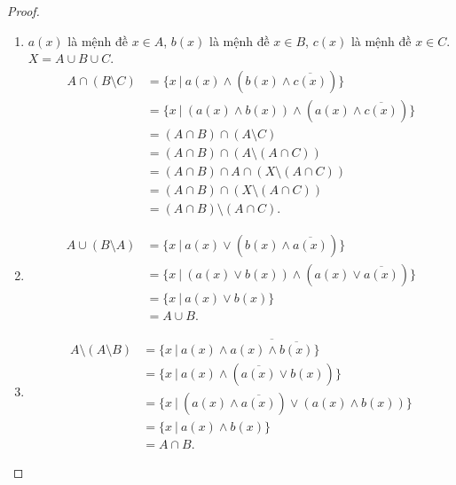\begin{proof}
\begin{enumerate}[label = (\alph*)]
        \item $a(x)$ là mệnh đề $x \in A$, $b(x)$ là mệnh đề $x\in B$, $c(x)$ là mệnh đề $x\in C$. $X = A\cup B\cup C$.
              \begin{align*}
                  A\cap (B\setminus C) & = \{ x\ |\ a(x) \land (b(x) \land \overline{c(x)}) \}              \\
                                       & = \{ x\ |\ (a(x) \land b(x)) \land (a(x) \land\overline{c(x)}) \} \\
                                       & = (A\cap B) \cap (A\setminus C)                                      \\
                                       & = (A\cap B) \cap (A\setminus (A\cap C))                              \\
                                       & = (A\cap B) \cap A \cap (X \setminus (A\cap C))                      \\
                                       & = (A\cap B) \cap (X \setminus (A\cap C))                             \\
                                       & = (A\cap B) \setminus (A\cap C).
              \end{align*}
        \item \begin{align*}
                  A\cup (B\setminus A) & = \{ x\ |\ a(x) \lor (b(x) \land \overline{a(x)}) \}             \\
                                       & = \{ x\ |\ (a(x) \lor b(x)) \land (a(x) \lor \overline{a(x)}) \} \\
                                       & = \{ x\ |\ a(x)\lor b(x) \}                                       \\
                                       & = A\cup B.
              \end{align*}
        \item \begin{align*}
                  A\setminus (A\setminus B) & = \{ x\ |\ a(x) \land \overline{a(x)\land \overline{b(x)}} \}     \\
                                            & = \{ x\ |\ a(x) \land (\overline{a(x)} \lor b(x)) \}               \\
                                            & = \{ x\ |\ (a(x) \land \overline{a(x)}) \lor (a(x) \land b(x)) \} \\
                                            & = \{ x\ |\ a(x) \land b(x) \}                                      \\
                                            & = A\cap B.
              \end{align*}
    \end{enumerate}
\end{proof}

